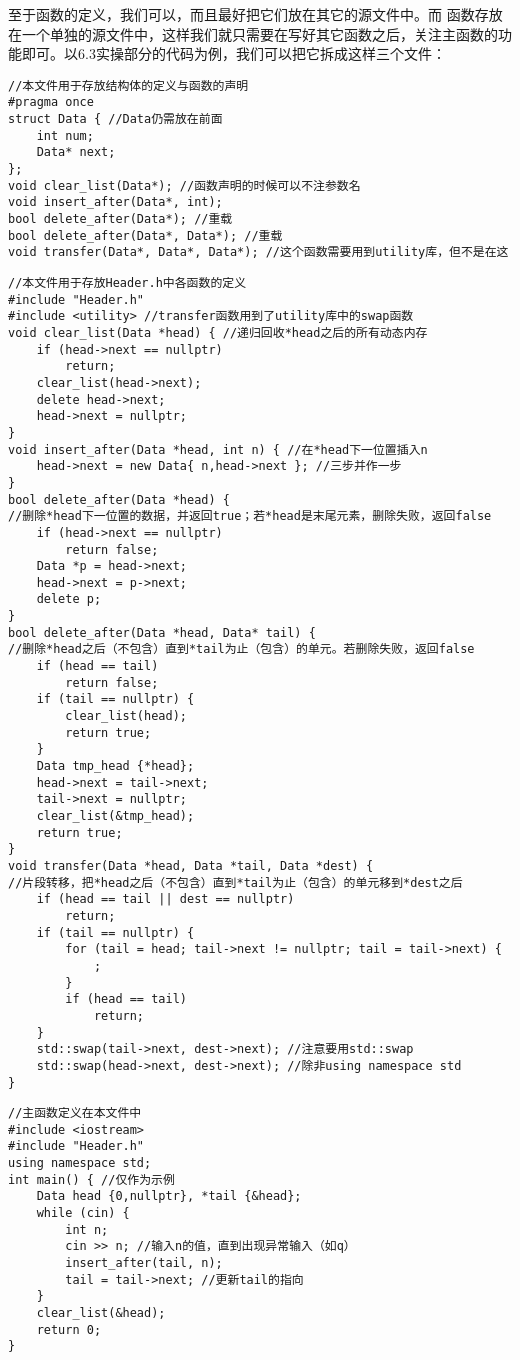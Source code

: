 至于函数的定义，我们可以，而且最好把它们放在其它的源文件中。而 \lstinline@main@ 函数存放在一个单独的源文件中，这样我们就只需要在写好其它函数之后，关注主函数的功能即可。以6.3实操部分的代码为例，我们可以把它拆成这样三个文件：
\begin{lstlisting}[caption=\texttt{Header.h}]
//本文件用于存放结构体的定义与函数的声明
#pragma once
struct Data { //Data仍需放在前面
    int num;
    Data* next;
};
void clear_list(Data*); //函数声明的时候可以不注参数名
void insert_after(Data*, int);
bool delete_after(Data*); //重载
bool delete_after(Data*, Data*); //重载
void transfer(Data*, Data*, Data*); //这个函数需要用到utility库，但不是在这
\end{lstlisting}
\begin{lstlisting}[caption=\texttt{Definition.cpp}]
//本文件用于存放Header.h中各函数的定义
#include "Header.h"
#include <utility> //transfer函数用到了utility库中的swap函数
void clear_list(Data *head) { //递归回收*head之后的所有动态内存
    if (head->next == nullptr)
        return;
    clear_list(head->next);
    delete head->next;
    head->next = nullptr;
}
void insert_after(Data *head, int n) { //在*head下一位置插入n
    head->next = new Data{ n,head->next }; //三步并作一步
}
bool delete_after(Data *head) {
//删除*head下一位置的数据，并返回true；若*head是末尾元素，删除失败，返回false
    if (head->next == nullptr)
        return false;
    Data *p = head->next;
    head->next = p->next;
    delete p;
}
bool delete_after(Data *head, Data* tail) {
//删除*head之后（不包含）直到*tail为止（包含）的单元。若删除失败，返回false
    if (head == tail)
        return false;
    if (tail == nullptr) {
        clear_list(head);
        return true;
    }
    Data tmp_head {*head};
    head->next = tail->next;
    tail->next = nullptr;
    clear_list(&tmp_head);
    return true;
}
void transfer(Data *head, Data *tail, Data *dest) {
//片段转移，把*head之后（不包含）直到*tail为止（包含）的单元移到*dest之后
    if (head == tail || dest == nullptr)
        return;
    if (tail == nullptr) {
        for (tail = head; tail->next != nullptr; tail = tail->next) {
            ;
        }
        if (head == tail)
            return;
    }
    std::swap(tail->next, dest->next); //注意要用std::swap
    std::swap(head->next, dest->next); //除非using namespace std
}
\end{lstlisting}
\begin{lstlisting}[caption=\texttt{Main.cpp}]
//主函数定义在本文件中
#include <iostream>
#include "Header.h"
using namespace std;
int main() { //仅作为示例
    Data head {0,nullptr}, *tail {&head};
    while (cin) {
        int n;
        cin >> n; //输入n的值，直到出现异常输入（如q）
        insert_after(tail, n);
        tail = tail->next; //更新tail的指向
    }
    clear_list(&head);
    return 0;
}
\end{lstlisting}
